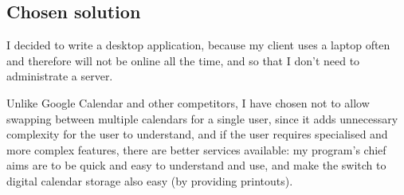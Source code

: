 \subsection{Chosen solution}

I decided to write a desktop application, because my client uses a laptop often
and therefore will not be online all the time, and so that I don't need to
administrate a server.

Unlike Google Calendar and other competitors, I have chosen not to allow
swapping between multiple calendars for a single user, since it adds unnecessary
complexity for the user to understand, and if the user requires specialised and
more complex features, there are better services available: my program's chief
aims are to be quick and easy to understand and use, and make the switch to
digital calendar storage also easy (by providing printouts).
